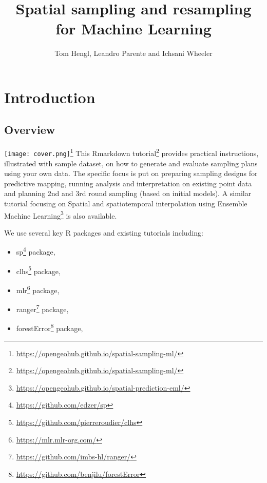 \documentclass[
  graybox,natbib,nospthms]{svmono}
\title{Spatial sampling and resampling for Machine Learning}
\author{Tom Hengl, Leandro Parente and Ichsani Wheeler}
\date{}
\providecommand{\tightlist}{%
  \setlength{\itemsep}{0pt}\setlength{\parskip}{0pt}}
\providecommand{\tightlist}{\setlength{\itemsep}{0pt}\setlength{\parskip}{0pt}}
\renewcommand{\href}[2]{#2 (\url{#1})}
\renewcommand{\href}[2]{#2\footnote{\url{#1}}}
\begin{document}
\maketitle

\thispagestyle{empty}
\begin{center}
\end{center}

\setlength{\abovedisplayskip}{-5pt}
\setlength{\abovedisplayshortskip}{-5pt}

{
\setcounter{tocdepth}{1}
\tableofcontents
}
\hypertarget{introduction}{%
\chapter*{Introduction}\label{introduction}}

\hypertarget{overview}{%
\section*{Overview}\label{overview}}

\href{https://opengeohub.github.io/spatial-sampling-ml/}{\texttt{[image: cover.png]}} This \href{https://opengeohub.github.io/spatial-sampling-ml/}{Rmarkdown tutorial} provides practical instructions, illustrated with sample
dataset, on how to generate and evaluate sampling plans using your own data.
The specific focus is put on preparing sampling designs for predictive mapping,
running analysis and interpretation on existing point data and planning 2nd and 3rd
round sampling (based on initial models). A similar tutorial focusing on \href{https://opengeohub.github.io/spatial-prediction-eml/}{Spatial
and spatiotemporal interpolation using Ensemble Machine Learning} is also available.

We use several key R packages and existing tutorials including:

\begin{itemize}
\tightlist
\item
  \href{https://github.com/edzer/sp}{sp} package,
\item
  \href{https://github.com/pierreroudier/clhs}{clhs} package,
\item
  \href{https://mlr.mlr-org.com/}{mlr} package,
\item
  \href{https://github.com/imbs-hl/ranger/}{ranger} package,
\item
  \href{https://github.com/benjilu/forestError}{forestError} package,
\end{itemize}
\end{document}

